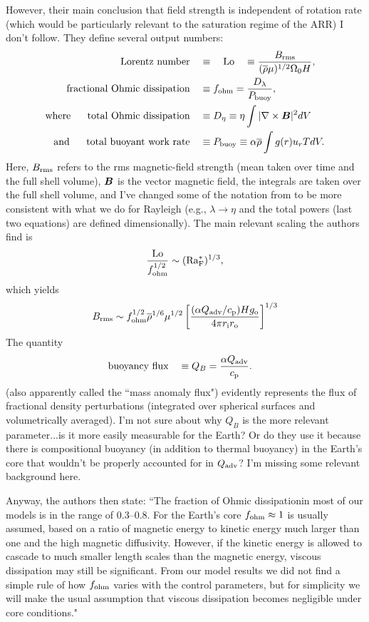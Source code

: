 \documentclass[12pt]{article} %
\begin{document}
However, their main conclusion that field strength is independent of rotation rate (which would be particularly relevant to the saturation regime of the ARR) I don't follow. They define several output numbers:
\begin{align}
	\text{Lorentz number} \quad & \equiv \quad {\rm{Lo}} \quad \equiv \frac{B_{\rm{rms}}}{(\overline{\rho}\mu)^{1/2}\Omega_0H},\\
		\text{fractional Ohmic dissipation} \quad & \equiv f_{\rm{ohm}} = \frac{D_\lambda}{P_{\rm{buoy}}},\\
		\text{where}\ \ \ \ \  \text{total Ohmic dissipation} \quad & \equiv D_\eta  \equiv \eta\int|\nabla\times\bm{B}|^2dV\\
		\text{and}\ \ \ \ \   \text{total buoyant work rate} \quad & \equiv P_{\rm{buoy}}  \equiv \alpha \overline{\rho} \int g(r)u_rTdV.
\end{align}
Here, $B_{\rm{rms}}$ refers to the rms magnetic-field strength (mean taken over time and the full shell volume), $\bm{B}$ is the vector magnetic field, the integrals are taken over the full shell volume, and I've changed some of the notation from \citet{Christensen2006} to be more consistent with what we do for Rayleigh (e.g., $\lambda\rightarrow\eta$ and the total powers (last two equations) are defined dimensionally). The main relevant scaling the authors find is
\begin{align}
	\frac{\rm{Lo}}{f_{\rm{ohm}}^{1/2}}\sim ({\rm{Ra^*_F}})^{1/3},
\end{align}
which yields
\begin{align}\label{eq:fieldstrength}
	B_{\rm{rms}}\sim f_{\rm{ohm}}^{1/2}\overline{\rho}^{1/6}\mu^{1/2}\left[\frac{(\alpha Q_{\rm{adv}}/c_{\rm{p}})Hg_{\rm{o}}}{4\pi r_{\rm{i}}r_{\rm{o}}}\right]^{1/3}
\end{align}
The quantity
\begin{align}
	 \text{buoyancy flux} \quad & \equiv Q_B = \frac{\alpha Q_{\rm{adv}}}{c_{\rm{p}}}.
\end{align}
(also apparently called the ``mass anomaly flux") evidently represents the flux of fractional density perturbations (integrated over spherical surfaces and volumetrically averaged). I'm not sure about why $Q_B$ is the more relevant parameter...is it more easily measurable for the Earth? Or do they use it because there is compositional buoyancy (in addition to thermal buoyancy) in the Earth's core that wouldn't be properly accounted for in $Q_{\rm{adv}}$? I'm missing some relevant background here.

Anyway, the authors then state: ``The fraction of Ohmic dissipationin most of our models is in the range of 0.3–0.8. For the Earth's core $f_{\rm{ohm}}\approx1$ is usually assumed, based on a ratio of magnetic energy to kinetic energy much larger than one and the high magnetic diffusivity. However, if the kinetic energy is allowed to cascade to much smaller length scales than the magnetic energy, viscous dissipation may still be significant. From our model results we did not find a simple rule of how $f_{\rm{ohm}}$ varies with the control parameters, but for simplicity we will make the usual assumption that viscous dissipation becomes negligible under core conditions." 
\end{document}
